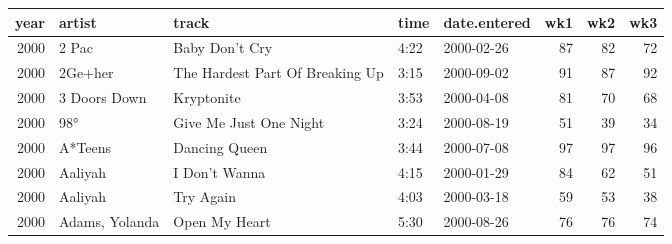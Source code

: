 \begin{tabular}{rllllrrr}
  \toprule
 year & artist & track & time & date.entered & wk1 & wk2 & wk3 \\ 
  \midrule
  2000 & 2 Pac & Baby Don't Cry & 4:22 & 2000-02-26 &  87 &  82 &  72 \\ 
  2000 & 2Ge+her & The Hardest Part Of Breaking Up & 3:15 & 2000-09-02 &  91 &  87 &  92 \\ 
  2000 & 3 Doors Down & Kryptonite & 3:53 & 2000-04-08 &  81 &  70 &  68 \\ 
  2000 & 98° & Give Me Just One Night & 3:24 & 2000-08-19 &  51 &  39 &  34 \\ 
  2000 & A*Teens & Dancing Queen & 3:44 & 2000-07-08 &  97 &  97 &  96 \\ 
  2000 & Aaliyah & I Don't Wanna & 4:15 & 2000-01-29 &  84 &  62 &  51 \\ 
  2000 & Aaliyah & Try Again & 4:03 & 2000-03-18 &  59 &  53 &  38 \\ 
  2000 & Adams, Yolanda & Open My Heart & 5:30 & 2000-08-26 &  76 &  76 &  74 \\ 
   \bottomrule
\end{tabular}
